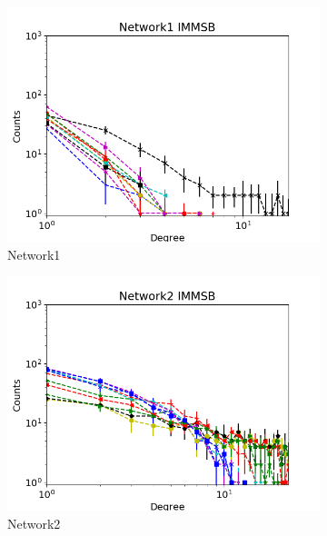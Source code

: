 
\begin{figure}[h]
        \centering
        \begin{subfigure}[b]{0.300\textwidth}
            \centering
            \includegraphics[width=\textwidth]{img/corpus/immsb_network1_1}
            \caption {{\small Network1}}    
        \end{subfigure}
        \begin{subfigure}[b]{0.300\textwidth}
            \centering
            \includegraphics[width=\textwidth]{img/corpus/immsb_network2_1}
            \caption {{\small Network2}}    
        \end{subfigure}
        \begin{subfigure}[b]{0.300\textwidth}

\end{subfigure}
\end{figure}
